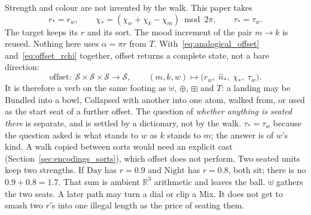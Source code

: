 \documentclass[12pt, a4paper]{article}
\begin{document}
Strength and colour are not invented by the walk. This paper takes
\begin{equation}
    r_{*}=r_w,
    \qquad
    \chi_{*}=(\chi_w+\chi_k-\chi_m)\bmod 2\pi,
    \qquad
    \tau_{*}=\tau_w.
    \label{eq:offset_rchi}
\end{equation}
The target keeps its $r$ and its sort. The mood increment of the pair
$m\to k$ is reused. Nothing here uses $\alpha=\pi r$ from $T$.
With~\eqref{eq:analogical_offset} and~\eqref{eq:offset_rchi} together,
offset returns a complete state, not a bare direction:
\[
\text{offset}:\;\mathcal{S}\times\mathcal{S}\times\mathcal{S}
\longrightarrow\mathcal{S},
\qquad
(m,k,w)\mapsto
\bigl(r_w,\;\hat n_{*},\;\chi_{*},\;\tau_w\bigr).
\]
It is therefore a verb on the same footing as $\uplus$, $\oplus$,
$\boxplus$ and $T$: a landing may be Bundled into a bowl, Collapsed
with another into one atom, walked from, or used as
the start seat of a further offset. The question of \emph{whether
anything is seated there} is separate, and is settled by a dictionary,
not by the walk. $\tau_{*}=\tau_w$ because the question asked is what
stands to $w$ as $k$ stands to $m$; the answer is of $w$'s kind. A
walk copied between sorts would need an explicit cast
(Section~\ref{sec:encodings_sorts}), which offset does not perform.
Two seated units keep two strengths. If $\mathrm{Day}$ has $r=0.9$
and $\mathrm{Night}$ has $r=0.8$, both sit; there is no
$0.9+0.8=1.7$. That sum is ambient $\mathbb{R}^3$ arithmetic and
leaves the ball. $\uplus$ gathers the two seats. A later path may
turn a dial or clip a Mix. It does not get to smash two $r$'s into
one illegal length as the price of seating them.
\end{document}
